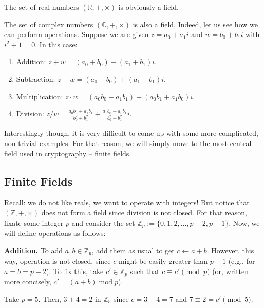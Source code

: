 \documentclass[../lecture-notes-148x210.tex]{subfiles}
\begin{document}
\begin{example}
    The set of real numbers $(\mathbb{R}, +, \times)$ is obviously a field.
\end{example}

\begin{example}
    The set of complex numbers $(\mathbb{C}, +, \times)$ is also a field. Indeed, let us see how we can perform 
    operations. Suppose we are given $z = a_0 + a_1i$ and $w = b_0 + b_1i$ with $i^2+1=0$. In this case:
    \begin{enumerate}
        \item Addition: $z + w = (a_0 + b_0) + (a_1 + b_1)i$.
        \item Subtraction: $z - w = (a_0 - b_0) + (a_1 - b_1)i$.
        \item Multiplication: $z \cdot w = (a_0b_0 - a_1b_1) + (a_0b_1 + a_1b_0)i$.
        \item Division: $z / w = \frac{a_0b_0 + a_1b_1}{b_0^2 + b_1^2} + \frac{a_1b_0 - a_0b_1}{b_0^2 + b_1^2}i$.
    \end{enumerate}
\end{example}

Interestingly though, it is very difficult to come up with some more complicated, non-trivial examples. For that 
reason, we will simply move to the most central field used in cryptography -- finite fields.

\subsection{Finite Fields}
Recall: we do not like reals, we want to operate with integers! But notice that $(\mathbb{Z},+,\times)$ does not 
form a field since division is not closed. For that reason, fixate some integer $p$ and consider the set 
$\mathbb{Z}_p := \{0,1,2,\dots,p-2,p-1\}$. Now, we will define operations as follows:

\textbf{Addition.} To add $a,b \in \mathbb{Z}_p$, add them as usual to get $c \gets a+b$. However, this way, 
operation is not closed, since $c$ might be easily greater than $p-1$ (e.g., for $a=b=p-2$). To fix this, 
take $c' \in \mathbb{Z}_p$ such that $c \equiv c' \pmod{p}$ (or, written more concisely, 
$c' = (a+b) \;\text{mod} \; p$). 

\begin{example}
    Take $p=5$. Then, $3+4 = 2$ in $\mathbb{Z}_5$ since $c=3+4=7$ and $7 \equiv 2 = c' \pmod{5}$.
\end{example}
\end{document}
